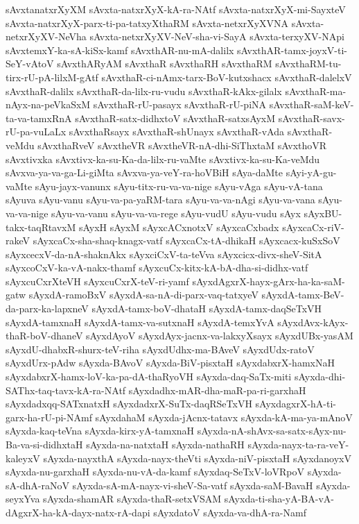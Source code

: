 {sAvxtanatxrXyXM
sAvxta-natxrXyX-kA-ra-NAtf
sAvxta-natxrXyX-mi-SayxteV
sAvxta-natxrXyX-parx-ti-pa-tatxyXthaRM
sAvxta-netxrXyXVNA
sAvxta-netxrXyXV-NeVha
sAvxta-netxrXyXV-NeV-sha-vi-SayA
sAvxta-terxyXV-NApi
sAvxtemxY-ka-sA-kiSx-kamf
sAvxthAR-nu-mA-dalilx
sAvxthAR-tamx-joyxV-ti-SeY-vAtoV
sAvxthARyAM
sAvxthaR
sAvxthaRH
sAvxthaRM
sAvxthaRM-tu-tirx-rU-pA-lilxM-gAtf
sAvxthaR-ci-nAmx-tarx-BoV-kutxshacx
sAvxthaR-dalelxV
sAvxthaR-dalilx
sAvxthaR-da-lilx-ru-vudu
sAvxthaR-kAkx-gilalx
sAvxthaR-ma-nAyx-na-peVkaSxM
sAvxthaR-rU-pasayx
sAvxthaR-rU-piNA
sAvxthaR-saM-keV-ta-va-tamxRnA
sAvxthaR-satx-didhxtoV
sAvxthaR-satxsAyxM
sAvxthaR-savx-rU-pa-vuLaLx
sAvxthaRsayx
sAvxthaR-shUnayx
sAvxthaR-vAda
sAvxthaR-veMdu
sAvxthaRveV
sAvxtheVR
sAvxtheVR-nA-dhi-SiThxtaM
sAvxthoVR
sAvxtivxka
sAvxtivx-ka-su-Ka-da-lilx-ru-vaMte
sAvxtivx-ka-su-Ka-veMdu
sAvxva-ya-va-ga-Li-giMta
sAvxva-ya-veY-ra-hoVBiH
sAya-daMte
sAyi-yA-gu-vaMte
sAyu-jayx-vanunx
sAyu-titx-ru-va-va-nige
sAyu-vAga
sAyu-vA-tana
sAyuva
sAyu-vanu
sAyu-va-pa-yaRM-tara
sAyu-va-va-nAgi
sAyu-va-vana
sAyu-va-va-nige
sAyu-va-vanu
sAyu-va-va-rege
sAyu-vudU
sAyu-vudu
sAyx
sAyxBU-takx-taqRtavxM
sAyxH
sAyxM
sAyxcACxnotxV
sAyxcaCxbadx
sAyxcaCx-riV-rakeV
sAyxcaCx-sha-shaq-knagx-vatf
sAyxcaCx-tA-dhikaH
sAyxcacx-kuSxSoV
sAyxcecxV-da-nA-shaknAkx
sAyxciCxV-ta-teVva
sAyxcicx-divx-sheV-SitA
sAyxcoCxV-ka-vA-nakx-thamf
sAyxcuCx-kitx-kA-bA-dha-si-didhx-vatf
sAyxcuCxrXteVH
sAyxcuCxrX-teV-ri-yamf
sAyxdAgxrX-hayx-gArx-ha-ka-saM-gatw
sAyxdA-ramoBxV
sAyxdA-sa-nA-di-parx-vaq-tatxyeV
sAyxdA-tamx-BeV-da-parx-ka-lapxneV
sAyxdA-tamx-boV-dhataH
sAyxdA-tamx-daqSeTxVH
sAyxdA-tamxnaH
sAyxdA-tamx-va-sutxnaH
sAyxdA-temxYvA
sAyxdAvx-kAyx-thaR-boV-dhaneV
sAyxdAyoV
sAyxdAyx-jacnx-va-lakxyXsayx
sAyxdUBx-yasAM
sAyxdU-dhabxR-shurx-teV-riha
sAyxdUdhx-ma-BAveV
sAyxdUdx-ratoV
sAyxdUrx-pAdw
sAyxda-BAvoV
sAyxda-BiV-pisxtaH
sAyxdabxrX-hamxNaH
sAyxdabxrX-hamx-loV-ka-pa-dA-thaRyoVH
sAyxda-daq-SaTx-miti
sAyxda-dhi-SAThx-taq-tavx-kA-ra-NAtf
sAyxdadhx-mAR-dha-maR-pa-ri-garxhaH
sAyxdadxqq-SATxnatxH
sAyxdadxrX-SuTx-daqRSeTxVH
sAyxdagxrX-hA-ti-garx-ha-rU-pi-NAmf
sAyxdahaM
sAyxda-jAcnx-tatavx
sAyxda-kA-ma-ya-mAnoV
sAyxda-kaq-teVna
sAyxda-kirx-yA-tamxnaH
sAyxda-nA-shAvx-sa-satx-sAyx-nu-Ba-va-si-didhxtaH
sAyxda-na-natxtaH
sAyxda-nathaRH
sAyxda-nayx-ta-ra-veY-kaleyxV
sAyxda-nayxthA
sAyxda-nayx-theVti
sAyxda-niV-pisxtaH
sAyxdanoyxV
sAyxda-nu-garxhaH
sAyxda-nu-vA-da-kamf
sAyxdaq-SeTxV-loVRpoV
sAyxda-sA-dhA-raNoV
sAyxda-sA-mA-nayx-vi-sheV-Sa-vatf
sAyxda-saM-BavaH
sAyxda-seyxYva
sAyxda-shamAR
sAyxda-thaR-setxVSAM
sAyxda-ti-sha-yA-BA-vA-dAgxrX-ha-kA-dayx-natx-rA-dapi
sAyxdatoV
sAyxda-va-dhA-ra-Namf
}
